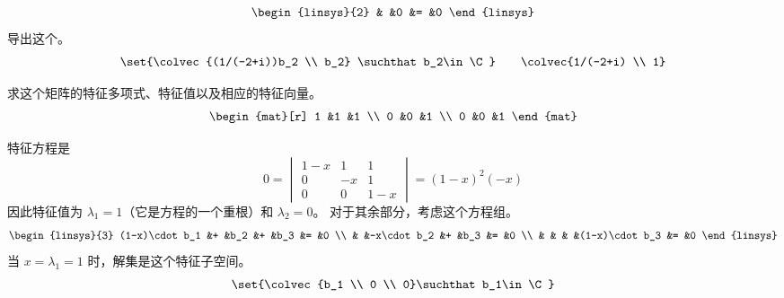 \begin{exercises}
\begin{answer}
\begin{equation*}
\begin{linsys}{2}
                                 &   &0               &=  &0
             \end{linsys}
           \end{equation*}
           导出这个。
           \begin{equation*}
             \set{\colvec{(1/(-2+i))b_2 \\ b_2}
                   \suchthat b_2\in\C}
             \qquad
             \colvec{1/(-2+i) \\ 1}
           \end{equation*}
    \end{answer}
  \item  
    求这个矩阵的特征多项式、特征值以及相应的特征向量。
    \begin{equation*}
      \begin{mat}[r]
        1  &1  &1  \\
        0  &0  &1  \\
        0  &0  &1
      \end{mat}
    \end{equation*}
    \begin{answer}
      特征方程是
      \begin{equation*}
        0=
        \begin{vmatrix}
          1-x  &1   &1   \\
          0    &-x  &1   \\
          0    &0   &1-x
        \end{vmatrix}
        =(1-x)^2(-x)
      \end{equation*}
      因此特征值为 $\lambda_1=1$（它是方程的一个重根）和 $\lambda_2=0$。
      对于其余部分，考虑这个方程组。
      \begin{equation*}
        \begin{linsys}{3}
          (1-x)\cdot b_1  &+  &b_2         &+  &b_3            &=  &0  \\
                          &   &-x\cdot b_2 &+  &b_3            &=  &0  \\
                          &   &            &   &(1-x)\cdot b_3 &= &0  
        \end{linsys}
      \end{equation*}
      当 $x=\lambda_1=1$ 时，解集是这个特征子空间。
      \begin{equation*}
        \set{\colvec{b_1 \\ 0 \\ 0}\suchthat b_1\in\C}
      \end{equation*}

\end{answer}
\end{exercises}
